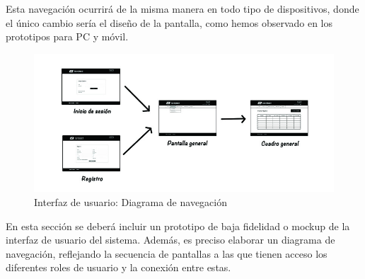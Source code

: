 Esta navegación ocurrirá de la misma manera en todo tipo de dispositivos, donde el único cambio sería el diseño de la pantalla, como hemos observado en los prototipos para PC y móvil.


\begin{figure}[h!]
\centering
  \includegraphics[scale=.55]{img/interfaz/navegacion.jpg}
  \caption{Interfaz de usuario: Diagrama de navegación}
  \label{fig:interfaz-navegacion}
\end{figure}


En esta sección se deberá incluir un prototipo de baja fidelidad o mockup de la interfaz de usuario del sistema. Además, es preciso elaborar un diagrama de navegación, reflejando la secuencia de pantallas a las que tienen acceso los diferentes roles de usuario y la conexión entre estas.




